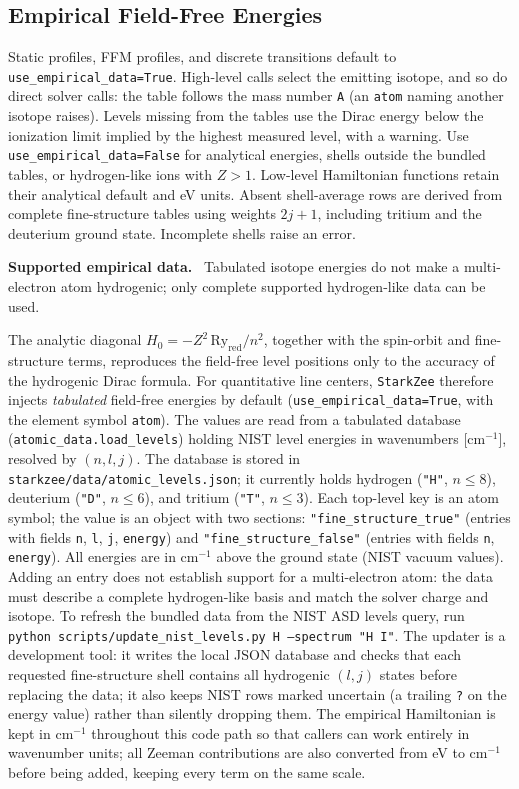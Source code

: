 \documentclass[11pt,a4paper]{article}
\newenvironment{caveat}[1][Caveat]{%
  \par\smallskip\noindent\begin{lrbox}{\notebox}\setlength{\fboxsep}{6pt}\begin{minipage}{\dimexpr\linewidth-2\fboxsep-2\fboxrule\relax}\small\textbf{#1.}\ }{%
  \end{minipage}\end{lrbox}\setlength{\fboxsep}{6pt}\fcolorbox{warnframe}{warnbg}{\usebox{\notebox}}\par\smallskip}
\numberwithin{equation}{section}
\begin{document}
\subsection{Empirical Field-Free Energies}
\label{sec:empirical}
Static profiles, FFM profiles, and discrete transitions default to
\texttt{use\_empirical\_data=True}. High-level calls select the emitting
isotope, and so do direct solver calls: the table follows the mass number
\texttt{A} (an \texttt{atom} naming another isotope raises). Levels missing
from the tables use the Dirac energy below the ionization limit implied by the
highest measured level, with a warning.
Use \texttt{use\_empirical\_data=False} for analytical energies,
shells outside the bundled tables, or hydrogen-like ions with $Z>1$.
Low-level Hamiltonian functions retain their analytical default and eV units.
Absent shell-average rows are derived from complete fine-structure tables
using weights $2j+1$, including tritium and the deuterium ground state.
Incomplete shells raise an error.

\begin{caveat}[Supported empirical data]
Tabulated isotope energies do not make a multi-electron atom hydrogenic;
only complete supported hydrogen-like data can be used.
\end{caveat}
The analytic diagonal $H_0 = -Z^2\,\mathrm{Ry}_{\mathrm{red}}/n^2$, together with the
spin-orbit and fine-structure terms, reproduces the field-free level positions only
to the accuracy of the hydrogenic Dirac formula. For quantitative line centers,
\texttt{StarkZee} therefore injects \emph{tabulated} field-free energies by default
(\texttt{use\_empirical\_data=True}, with the element symbol \texttt{atom}). The
values are read from a tabulated database (\texttt{atomic\_data.load\_levels}) holding
NIST level energies \cite{nist} in wavenumbers [cm$^{-1}$], resolved by $(n, l, j)$.  The database
is stored in \texttt{starkzee/data/atomic\_levels.json}; it currently holds hydrogen
(\texttt{"H"}, $n\le8$), deuterium (\texttt{"D"}, $n\le6$), and tritium (\texttt{"T"}, $n\le3$).
Each top-level key is an atom symbol; the value is an object with two
sections: \texttt{"fine\_structure\_true"} (entries with fields \texttt{n}, \texttt{l},
\texttt{j}, \texttt{energy}) and \texttt{"fine\_structure\_false"} (entries with fields
\texttt{n}, \texttt{energy}).  All energies are in cm$^{-1}$ above the ground state
(NIST vacuum values). Adding an entry does not establish support for a
multi-electron atom: the data must describe a complete hydrogen-like basis and
match the solver charge and isotope. To refresh the bundled data from the NIST ASD levels query, run
\texttt{python scripts/update\_nist\_levels.py H --spectrum "H I"}.  The updater is a
development tool: it writes the local JSON database and checks that each requested
fine-structure shell contains all hydrogenic $(l,j)$ states before replacing the data;
it also keeps NIST rows marked uncertain (a trailing \texttt{?} on the energy value)
rather than silently dropping them.
The empirical Hamiltonian is kept in cm$^{-1}$ throughout this code path so that
callers can work entirely in wavenumber units; all Zeeman contributions are
also converted from eV to cm$^{-1}$ before being added, keeping every term on
the same scale.
\end{document}
